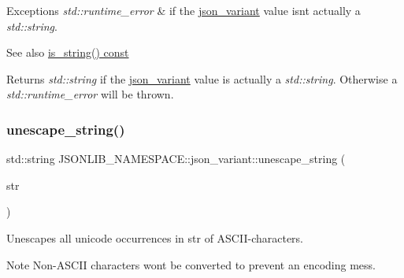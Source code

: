 \begin{DoxyExceptions}{Exceptions}
{\em std\+::runtime\+\_\+error} & if the \hyperlink{classJSONLIB__NAMESPACE_1_1json__variant}{json\+\_\+variant} value isn\textquotesingle{}t actually a {\itshape std\+::string}. \\
\hline
\end{DoxyExceptions}
\begin{DoxySeeAlso}{See also}
\hyperlink{classJSONLIB__NAMESPACE_1_1json__variant_ae097a22fe419dd083ff07bfebf0e8151}{is\+\_\+string() const} 
\end{DoxySeeAlso}
\begin{DoxyReturn}{Returns}
{\itshape std\+::string} if the \hyperlink{classJSONLIB__NAMESPACE_1_1json__variant}{json\+\_\+variant} value is actually a {\itshape std\+::string}. Otherwise a {\itshape std\+::runtime\+\_\+error} will be thrown. 
\end{DoxyReturn}
\mbox{\label{classJSONLIB__NAMESPACE_1_1json__variant_ab3b411443074a97949b5675676d0b136}} 
\subsubsection{\texorpdfstring{unescape\+\_\+string()}{unescape\_string()}\hspace{0.1cm}{\footnotesize\ttfamily [1/2]}}
{\footnotesize\ttfamily std\+::string J\+S\+O\+N\+L\+I\+B\+\_\+\+N\+A\+M\+E\+S\+P\+A\+C\+E\+::json\+\_\+variant\+::unescape\+\_\+string (\begin{DoxyParamCaption}\item[{std\+::string}]{str }\end{DoxyParamCaption})\hspace{0.3cm}{\ttfamily [static]}}



Unescapes all unicode occurrences in {\ttfamily str} of A\+S\+C\+I\+I-\/characters. 

\begin{DoxyNote}{Note}
Non-\/\+A\+S\+C\+II characters won\textquotesingle{}t be converted to prevent an encoding mess. 
\end{DoxyNote}

